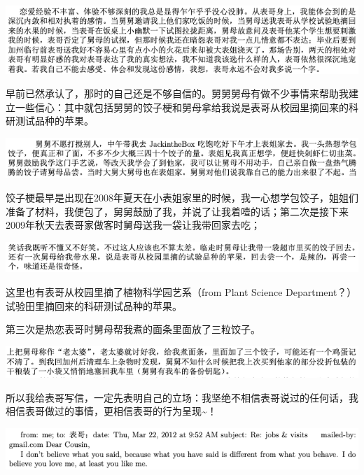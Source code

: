 \documentclass[9pt, b5paper]{article}
\begin{document}
\begin{center}
\includegraphics[width=.9\linewidth]{./pic/p1p118-2.png}
\end{center}

早前已然承认了，那时的自己还是不够自信的。舅舅舅母有做不少事情来帮助我建立一些信心：其中就包括舅舅的饺子梗和舅母拿给我说是表哥从校园里摘回来的科研测试品种的苹果。

\begin{center}
\includegraphics[width=.9\linewidth]{./pic/p1p34-2.png}
\end{center}

饺子梗最早是出现在2008年夏天在小表姐家里的时候，我一心想学包饺子，姐姐们准备了材料，我便包了，舅舅鼓励了我，并说了让我着噎的话；第二次是接下来2009年秋天去表哥家做客时舅母送我一袋让我带回家去吃；

\begin{center}
\includegraphics[width=.9\linewidth]{./pic/p1p39-1.png}
\end{center}

这里也有表哥从校园里摘了植物科学园艺系（from Plant Science Department？）试验田里摘回来的科研测试品种的苹果。

第三次是热恋表哥时舅母帮我煮的面条里面放了三粒饺子。 

\begin{center}
\includegraphics[width=.9\linewidth]{./pic/p1p51-1.png}
\end{center}

所以我给表哥写信，一定先表明自己的立场：我坚绝不相信表哥说过的任何话，我相信表哥做过的事情，更相信表哥的行为呈现\textasciitilde{}！

\begin{center}
\includegraphics[width=.9\linewidth]{./pic/p1p116-2.png}
\end{center}
\end{document}
